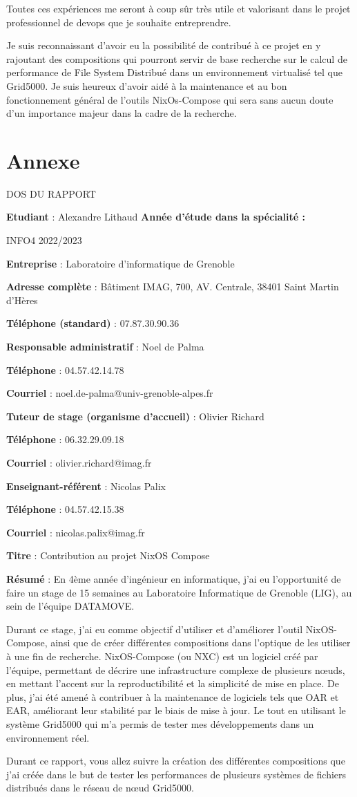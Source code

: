 \documentclass[a4paper,french,12pt, titlepage]{article}
\makeatletter
\newcommand{\makefooter}{%
  \makefooterhooka
}
\newcommand{\makefooterhooka}{%
    \begin{center}
        \begin{Large}
        DOS DU RAPPORT
        \end{Large}
    \end{center}
    
    
    \textbf{Etudiant} : Alexandre Lithaud
    \hfill \textbf{Année d’étude dans la spécialité :}
    
    \hfill INFO4 2022/2023
    
    \hfill
    
    \textbf{Entreprise} : Laboratoire d'informatique de Grenoble 

    \textbf{Adresse complète} : Bâtiment IMAG, 700, AV. Centrale, 38401
Saint Martin d'Hères

    \textbf{Téléphone (standard)} : 07.87.30.90.36
    
    \hfill
    
    \textbf{Responsable administratif} : Noel de Palma 

    \textbf{Téléphone} : 04.57.42.14.78

    \textbf{Courriel} : noel.de-palma@univ-grenoble-alpes.fr

    \hfill
    
    \textbf{Tuteur de stage (organisme d’accueil)} : Olivier Richard

    \textbf{Téléphone} : 06.32.29.09.18

    \textbf{Courriel} : olivier.richard@imag.fr
    
    \hfill
    
    \textbf{Enseignant-référent} : Nicolas Palix

    \textbf{Téléphone} : 04.57.42.15.38 

    \textbf{Courriel} : nicolas.palix@imag.fr 

    \hfill
    
    \textbf{Titre} : Contribution au projet NixOS Compose
    
    \hfill

    \textbf{Résumé} : En 4ème année d'ingénieur en informatique, j'ai eu
l'opportunité de faire un stage de 15 semaines au Laboratoire
Informatique de Grenoble (LIG), au sein de l'équipe DATAMOVE.\newline

Durant ce stage, j'ai eu comme objectif d'utiliser et d'améliorer
l'outil NixOS-Compose, ainsi que de créer différentes compositions dans
l'optique de les utiliser à une fin de recherche. NixOS-Compose (ou NXC)
est un logiciel créé par l'équipe, permettant de décrire une
infrastructure complexe de plusieurs nœuds, en mettant l'accent sur la
reproductibilité et la simplicité de mise en place. De plus, j'ai été
amené à contribuer à la maintenance de logiciels tels que OAR et EAR,
améliorant leur stabilité par le biais de mise à jour. Le tout en
utilisant le système Grid5000 qui m'a permis de tester mes
développements dans un environnement réel.\newline

Durant ce rapport, vous allez suivre la création des différentes
compositions que j'ai créée dans le but de tester les performances de
plusieurs systèmes de fichiers distribués dans le réseau de nœud
Grid5000.
}
\makeatother
\begin{document}
Toutes ces expériences me seront à coup sûr très utile et valorisant
dans le projet professionnel de devops que je souhaite entreprendre.

Je suis reconnaissant d'avoir eu la possibilité de contribué à ce projet
en y rajoutant des compositions qui pourront servir de base recherche
sur le calcul de performance de File System Distribué dans un
environnement virtualisé tel que Grid5000. Je suis heureux d'avoir aidé
à la maintenance et au bon fonctionnement général de l'outils
NixOs-Compose qui sera sans aucun doute d'un importance majeur dans la
cadre de la recherche.\newline

\newpage

\hypertarget{annexe}{%
\section{Annexe}\label{annexe}}

\printbibliography

\printglossaries

\begin{titlingpage}
\newpage
\makefooter
\end{titlingpage}
\end{document}
